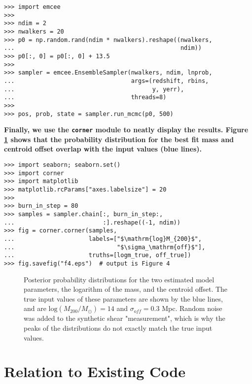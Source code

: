 \documentclass[twocolumn]{aastex6}
\newcommand{\code}{\lstinline[style=codeintext]}
\begin{document}
\begin{verbatim}
>>> import emcee
>>> 
>>> ndim = 2
>>> nwalkers = 20
>>> p0 = np.random.rand(ndim * nwalkers).reshape((nwalkers, 
...                                               ndim))
>>> p0[:, 0] = p0[:, 0] + 13.5
>>> 
>>> sampler = emcee.EnsembleSampler(nwalkers, ndim, lnprob,
...                                 args=(redshift, rbins, 
...                                       y, yerr), 
...                                 threads=8)
>>> 
>>> pos, prob, state = sampler.run_mcmc(p0, 500)
\end{verbatim}

{\bf Finally, we use the \code{corner} module \citep{corner} to neatly display the results. Figure \ref{f4} shows that the probability distribution for the best fit mass and centroid offset overlap with the input values (blue lines).}

\begin{verbatim}
>>> import seaborn; seaborn.set()
>>> import corner
>>> import matplotlib
>>> matplotlib.rcParams["axes.labelsize"] = 20
>>> 
>>> burn_in_step = 80
>>> samples = sampler.chain[:, burn_in_step:, 
...                         :].reshape((-1, ndim))
>>> fig = corner.corner(samples,
...                     labels=["$\mathrm{log}M_{200}$", 
...                             "$\sigma_\mathrm{off}$"],
...                     truths=[logm_true, off_true])
>>> fig.savefig("f4.eps")  # output is Figure 4
\end{verbatim}
\begin{figure}
\caption{Posterior probability distributions for the two estimated model parameters, the logarithm of the mass, and the centroid offset. The true input values of these parameters are shown by the blue lines, and are $\mathrm{log}(M_{200}/M_{\odot}) = 14$ and $\sigma_{\mathrm off} = 0.3$ Mpc. Random noise was added to the synthetic shear "measurement", which is why the peaks of the distributions do not exactly match the true input values.}
\label{f4}
\end{figure}


\section{Relation to Existing Code}
\end{document}
